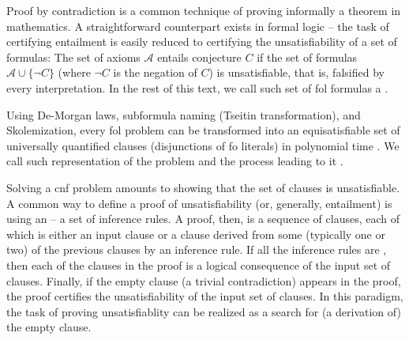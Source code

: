
Proof by contradiction is a common technique of proving informally a theorem in mathematics.
A straightforward counterpart exists in formal logic --
the task of certifying
entailment is easily reduced to
certifying the
unsatisfiability of a set of formulas:
The set of axioms $\mathcal{A}$ entails conjecture $C$ if the set of formulas $\mathcal{A} \cup \{\lnot C\}$ (where $\lnot C$ is the negation of $C$) is unsatisfiable, that is, falsified by every interpretation.
In the rest of this text, we call such set of \gls{fol} formulas a .


Using De-Morgan laws, subformula naming (Tseitin transformation), and Skolemization,
every \gls{fol} problem can be transformed into an equisatisfiable set of universally quantified clauses (disjunctions of \gls{fo} literals) in polynomial time \cite{DBLP:books/el/RV01/NonnengartW01}.
We call such representation of the problem 
and the process leading to it .

Solving a \gls{cnf} problem amounts to showing that the set of clauses is unsatisfiable.
A common way to define a proof of unsatisfiability (or, generally, entailment) is using an  -- a set of inference rules.
A proof, then, is a sequence of clauses,
each of which is either an input clause or a clause derived from some (typically one or two) of the previous clauses by an inference rule.
If all the inference rules are ,
then each of the clauses in the proof is a logical consequence of the input set of clauses.
Finally, if the empty clause (a trivial contradiction) appears in the proof,
the proof certifies the unsatisfiability of the input set of clauses.
In this paradigm, the task of proving unsatisfiablity can be realized as a search for (a derivation of) the empty clause.

